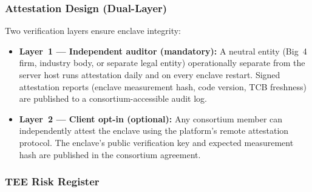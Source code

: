 \documentclass[10pt,journal]{IEEEtran}
\begin{document}
\subsubsection{Attestation Design (Dual-Layer)}

Two verification layers ensure enclave integrity:

\begin{itemize}
  \item \textbf{Layer~1 --- Independent auditor (mandatory):} A neutral entity (Big~4 firm, industry body, or separate legal entity) operationally separate from the server host runs attestation daily and on every enclave restart. Signed attestation reports (enclave measurement hash, code version, TCB freshness) are published to a consortium-accessible audit log.
  \item \textbf{Layer~2 --- Client opt-in (optional):} Any consortium member can independently attest the enclave using the platform's remote attestation protocol. The enclave's public verification key and expected measurement hash are published in the consortium agreement.
\end{itemize}

\subsubsection{TEE Risk Register}

\begin{table}[t]
\centering
\caption{TEE threat risk register and graceful degradation paths.}
\label{tab:tee-risk}
\footnotesize
{}
\end{table}
\end{document}
